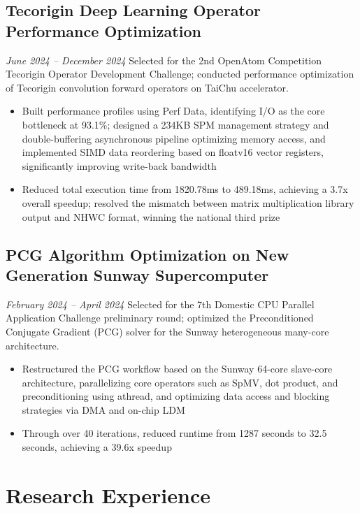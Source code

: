 \documentclass{resume}
\begin{document}
\subsection{\textbf{Tecorigin Deep Learning Operator Performance Optimization}}
\textit{June 2024 -- December 2024}
Selected for the 2nd OpenAtom Competition Tecorigin Operator Development Challenge; conducted performance optimization of Tecorigin convolution forward operators on TaiChu accelerator.
\begin{itemize}
  \item Built performance profiles using Perf Data, identifying I/O as the core bottleneck at 93.1\%; designed a 234KB SPM management strategy and double-buffering asynchronous pipeline optimizing memory access, and implemented SIMD data reordering based on floatv16 vector registers, significantly improving write-back bandwidth
  \item Reduced total execution time from 1820.78ms to 489.18ms, achieving a 3.7x overall speedup; resolved the mismatch between matrix multiplication library output and NHWC format, winning the national third prize
\end{itemize}

\subsection{\textbf{PCG Algorithm Optimization on New Generation Sunway Supercomputer}}
\textit{February 2024 -- April 2024}
Selected for the 7th Domestic CPU Parallel Application Challenge preliminary round; optimized the Preconditioned Conjugate Gradient (PCG) solver for the Sunway heterogeneous many-core architecture.
\begin{itemize}
  \item Restructured the PCG workflow based on the Sunway 64-core slave-core architecture, parallelizing core operators such as SpMV, dot product, and preconditioning using athread, and optimizing data access and blocking strategies via DMA and on-chip LDM
  \item Through over 40 iterations, reduced runtime from 1287 seconds to 32.5 seconds, achieving a 39.6x speedup
\end{itemize}

\section{Research Experience}
\end{document}
